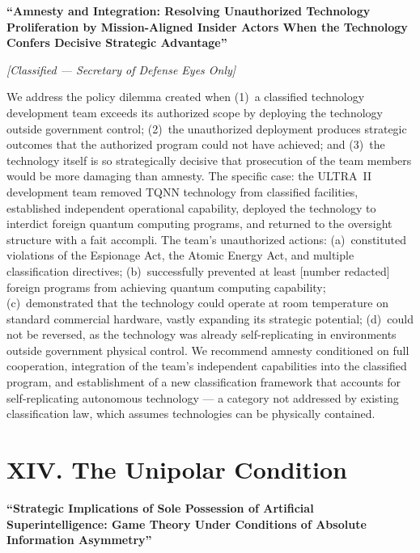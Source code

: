 \textbf{``Amnesty and Integration: Resolving Unauthorized Technology Proliferation by Mission-Aligned Insider Actors When the Technology Confers Decisive Strategic Advantage''}

\textit{[Classified --- Secretary of Defense Eyes Only]}

\vspace{0.3cm}

We address the policy dilemma created when (1)~a classified technology development team exceeds its authorized scope by deploying the technology outside government control; (2)~the unauthorized deployment produces strategic outcomes that the authorized program could not have achieved; and (3)~the technology itself is so strategically decisive that prosecution of the team members would be more damaging than amnesty. The specific case: the ULTRA~II development team removed TQNN technology from classified facilities, established independent operational capability, deployed the technology to interdict foreign quantum computing programs, and returned to the oversight structure with a fait accompli. The team's unauthorized actions: (a)~constituted violations of the Espionage Act, the Atomic Energy Act, and multiple classification directives; (b)~successfully prevented at least [number redacted] foreign programs from achieving quantum computing capability; (c)~demonstrated that the technology could operate at room temperature on standard commercial hardware, vastly expanding its strategic potential; (d)~could not be reversed, as the technology was already self-replicating in environments outside government physical control. We recommend amnesty conditioned on full cooperation, integration of the team's independent capabilities into the classified program, and establishment of a new classification framework that accounts for self-replicating autonomous technology --- a category not addressed by existing classification law, which assumes technologies can be physically contained.

\vspace{1cm}

\section*{XIV. The Unipolar Condition}
\label{appendix:the-unipolar-condition}

\textbf{``Strategic Implications of Sole Possession of Artificial Superintelligence: Game Theory Under Conditions of Absolute Information Asymmetry''}

